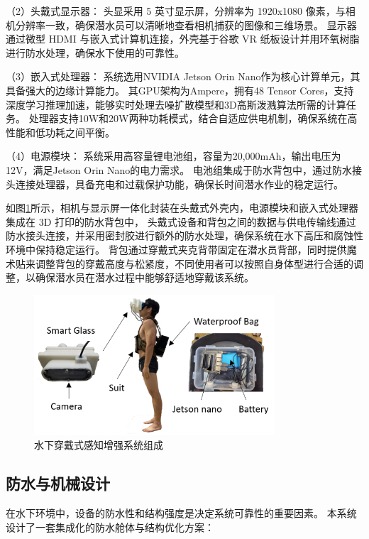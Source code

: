 （2）头戴式显示器：
头显采用 5 英寸显示屏，分辨率为 1920x1080 像素，与相机分辨率一致，确保潜水员可以清晰地查看相机捕获的图像和三维场景。
显示器通过微型 HDMI 与嵌入式计算机连接，外壳基于谷歌 VR 纸板设计并用环氧树脂进行防水处理，确保水下使用的可靠性。

（3）嵌入式处理器：
系统选用NVIDIA Jetson Orin Nano作为核心计算单元，其具备强大的边缘计算能力。
其GPU架构为Ampere，拥有48 Tensor Cores，支持深度学习推理加速，能够实时处理去噪扩散模型和3D高斯泼溅算法所需的计算任务。
处理器支持10W和20W两种功耗模式，结合自适应供电机制，确保系统在高性能和低功耗之间平衡。

（4）电源模块：
系统采用高容量锂电池组，容量为20,000mAh，输出电压为12V，满足Jetson Orin Nano的电力需求。
电池组集成于防水背包中，通过防水接头连接处理器，具备充电和过载保护功能，确保长时间潜水作业的稳定运行。

如图\ref{img:system}所示，相机与显示屏一体化封装在头戴式外壳内，电源模块和嵌入式处理器集成在 3D 打印的防水背包中，
头戴式设备和背包之间的数据与供电传输线通过防水接头连接，并采用密封胶进行额外的防水处理，确保系统在水下高压和腐蚀性环境中保持稳定运行。
背包通过穿戴式夹克背带固定在潜水员背部，同时提供魔术贴来调整背包的穿戴高度与松紧度，不同使用者可以按照自身体型进行合适的调整，以确保潜水员在潜水过程中能够舒适地穿戴该系统。
\begin{figure}
    \centering
    \includegraphics[width=0.8\textwidth]{figures/ch5/architecture of system.jpg}
    \caption{水下穿戴式感知增强系统组成}
    \label{img:system}
\end{figure}

\subsection{防水与机械设计}
在水下环境中，设备的防水性和结构强度是决定系统可靠性的重要因素。
本系统设计了一套集成化的防水舱体与结构优化方案：

